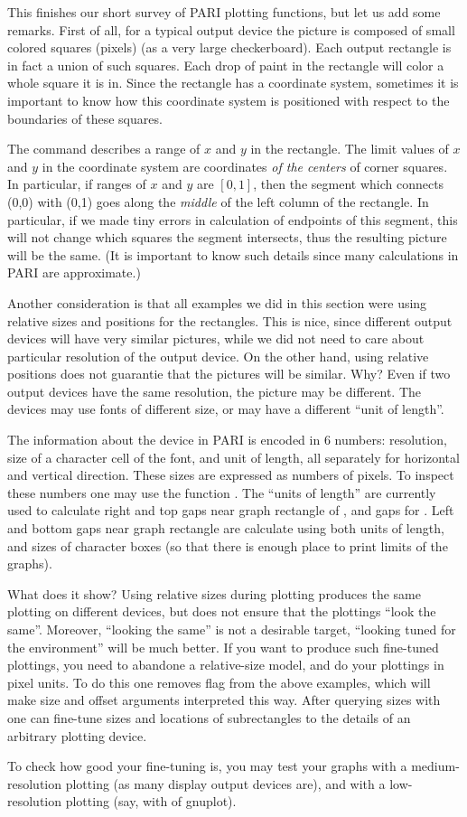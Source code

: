 This finishes our short survey of PARI plotting functions, but let us add
some remarks.  First of all, for a typical output device the picture is
composed of small colored squares (pixels) (as a very large checkerboard).
Each output rectangle is in fact a union of such squares.  Each drop
of paint in the rectangle will color a whole square it is in.  Since the
rectangle has a coordinate system, sometimes it is important to know how
this coordinate system is positioned with respect to the boundaries of
these squares.

The command  describes a range of $x$ and $y$ in the
rectangle.  The limit values of $x$ and $y$ in the coordinate system are
coordinates {\it of the centers} of corner squares.  In particular,
if ranges of $x$ and $y$ are $[0,1]$, then the segment which connects (0,0)
with (0,1) goes along the {\it middle} of the left column of the rectangle.
In particular, if we made tiny errors in calculation of endpoints of this
segment, this will not change which squares the segment intersects, thus
the resulting picture will be the same.  (It is important to know such details
since many calculations in PARI are approximate.)

Another consideration is that all examples we did in this section were
using relative sizes and positions for the rectangles.  This is nice, since
different output devices will have very similar pictures, while we
did not need to care about particular resolution of the output device.
On the other hand,
using relative positions does not guarantie that the pictures will be
similar.  Why?  Even if two output devices have the same resolution,
the picture may be different.  The devices may use fonts of different
size, or may have a different ``unit of length''.

The information about the device in PARI is encoded in 6 numbers: resolution,
size of a character cell of the font, and unit of length, all separately
for horizontal and vertical direction.  These sizes are expressed as
numbers of pixels.  To inspect these numbers one may use the function
.  The ``units of length'' are currently used to calculate
right and top gaps near graph rectangle of , and gaps for
.  Left and bottom gaps near graph rectangle are calculate
using both units of length, and sizes of character boxes (so that there
is enough place to print limits of the graphs).

What does it show?  Using relative sizes during plotting produces
 the same plotting on different devices, but does not
ensure that the plottings ``look the same''.  Moreover, ``looking the
same'' is not a desirable target, ``looking tuned for the environment''
will be much better.  If you want to produce such fine-tuned plottings,
you need to abandone a relative-size model, and do your plottings in
pixel units.  To do this one removes flag  from the above
examples, which will make size and offset arguments interpreted this way.
After querying sizes with  one can fine-tune sizes and
locations of subrectangles to the details of an arbitrary plotting
device.

To check how good your fine-tuning is, you may test your graphs with a
medium-resolution plotting (as many display output devices are), and
with a low-resolution plotting (say, with  of gnuplot).
\vfill\eject\bye
